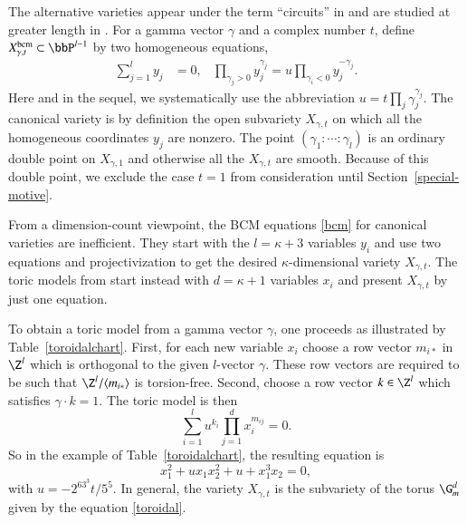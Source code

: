 \documentclass{notices}
\numberwithin{equation}{section}
\numberwithin{table}{section}
\numberwithin{figure}{section}
\begin{document}
{ The alternative varieties 
appear under the term ``circuits'' in \cite{GKZ} and 
are studied at greater length in \cite{BCM}. 
For a gamma vector $\gamma$ and a complex number $t$, define  
$X^{\rm bcm}_{\gamma,t} \subset \bbP^{l-1}$ by 
two homogeneous equations,
\begin{align}
\label{bcm}
\sum_{j=1}^{l} y_j & = 0, &
\prod_{\gamma_j>0}y_j^{\gamma_j}= u \prod_{\gamma_i<0}y_j^{-\gamma_j}.
\end{align}
Here and in the sequel, we systematically use the abbreviation $u = t \prod_j \gamma_j^{\gamma_j}$.  
The canonical variety is by definition the open subvariety $X_{\gamma,t}$ 
on which all the homogeneous coordinates $y_j$ are nonzero.   
The point 
$(\gamma_1: \cdots : \gamma_l)$ is
an ordinary double point on $X_{\gamma,1}$ and
otherwise all the $X_{\gamma,t}$ are smooth.   Because
of this double point, we exclude the case $t=1$ from consideration
until Section~\ref{special-motive}.  




 From a dimension-count viewpoint, the BCM
equations \eqref{bcm} for canonical varieties are inefficient.  They
start with the $l = \kappa+3$ variables $y_i$ and use two equations
and projectivization to get the desired $\kappa$-dimensional variety
$X_{\gamma,t}$.  The toric models from \cite{GKZ} start
instead with $d=\kappa+1$ variables $x_i$ and present $X_{\gamma,t}$
by just one equation. 

 

To obtain a toric model from a gamma vector
$\gamma$, one proceeds as illustrated by Table~\ref{toroidalchart}. 
First, for each new variable $x_i$ choose a row vector $m_{i*}$ in $\Z^l$ which
is orthogonal to the given $l$-vector $\gamma$.  These row vectors are
required to be such that $\Z^l/\langle m_{i*} \rangle$ is torsion-free.  
Second, choose a row vector $k \in \Z^l$ which satisfies $\gamma \cdot k = 1$.  
The toric model is then 
\begin{equation}
\label{toroidal}
\sum_{i=1}^l u^{k_i} \prod_{j=1}^d x_i^{m_{ij}}= 0.
\end{equation}
So in the example of Table~\ref{toroidalchart}, the  
resulting equation is 
\begin{equation}
\label{toroidalexample}
x_1^2 + u x_1 x_2^2 + u + x_1^3 x_2= 0,
\end{equation}
with $u=-2^63^3 t/5^5$.    In general, the variety $X_{\gamma,t}$ is the subvariety of 
the torus $\G_m^d$ given by the equation \eqref{toroidal}.
 
}
\end{document}
